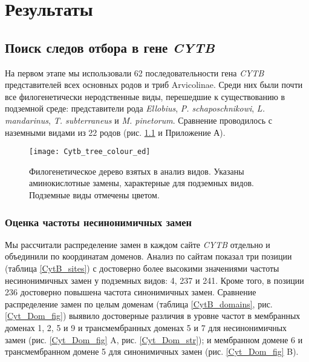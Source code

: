 \chapter{Результаты}\label{res}

\section{Поиск следов отбора в гене \textit{CYTB}}

На первом этапе мы использовали 62 последовательности гена \textit{CYTB} представителей всех основных родов и триб Arvicolinae. Среди них были почти все филогенетически неродственные виды, перешедшие к существованию в подземной среде: представители рода \textit{Ellobius}, \textit{P. schaposchnikowi}, \textit{L. mandarinus}, \textit{T. subterraneus} и \textit{M. pinetorum}. Сравнение проводилось с наземными видами из 22 родов (рис. \ref{PhyloTree} и Приложение А). 

\begin{figure}[h!]
	\begin{center}
		\texttt{[image: Cytb\_tree\_colour\_ed]}
	\end{center}
	\caption{Филогенетическое дерево взятых в анализ видов. Указаны аминокислотные замены, характерные для подземных видов. Подземные виды отмечены цветом.}
	\label{PhyloTree}
\end{figure}


\subsection{Оценка частоты несинонимичных замен}


Мы рассчитали распределение замен в каждом сайте \textit{CYTB} отдельно и объединили по координатам доменов. Анализ по сайтам показал три позиции (таблица \ref{CytB_sites}) с достоверно более высокими значениями частоты несинонимичных замен у подземных видов: 4, 237 и 241. Кроме того, в позиции 236 достоверно повышена частота синонимичных замен. Сравнение распределение замен по целым доменам (таблица \ref{CytB_domains}, рис. \ref{Cyt_Dom_fig}) выявило достоверные различия в уровне частот в мембранных доменах 1, 2, 5 и 9 и трансмембранных доменах 5 и 7 для несинонимичных замен (рис. \ref{Cyt_Dom_fig} A, рис. \ref{Cyt_Dom_str}); и мембранном домене 6 и трансмембранном домене 5 для синонимичных замен (рис. \ref{Cyt_Dom_fig} B). 


